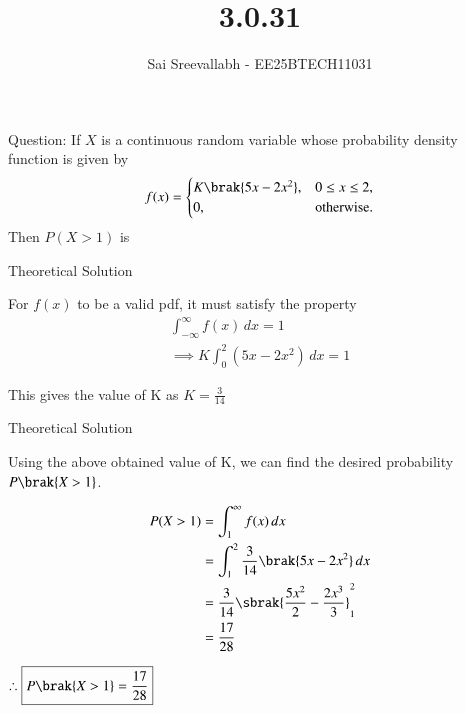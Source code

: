 \documentclass{beamer}
\title 
{3.0.31}
\date{}
\author 
{Sai Sreevallabh - EE25BTECH11031}
\begin{document}
\frame{\titlepage}

\begin{frame}{Question:}
If $X$ is a continuous random variable whose probability density function is given by
       $$
f(x) =
\begin{cases}
K\brak{5x - 2x^2}, & 0 \leq x \leq 2, \\
0, & \text{otherwise}.
\end{cases}
$$
 Then $P(X>1)$ is
    
\end{frame}

\begin{frame}{Theoretical Solution}

For $f(x)$ to be a valid pdf, it must satisfy the property
\begin{align*}
    \int_{-\infty}^{\infty} f(x) \, dx = 1\\
    \implies K \int_{0}^{2} (5x - 2x^2) \, dx = 1
\end{align*}

This gives the value of K as $\boxed{K = \frac{3}{14}}$
    
\end{frame}

\begin{frame}{Theoretical Solution}

Using the above obtained value of K, we can find the desired probability $P\brak{X>1}$.

\begin{align*}
P(X > 1) &= \int_{1}^{\infty} f(x) \, dx \\
&= \int_{1}^{2} \frac{3}{14} \brak{5x - 2x^2} \, dx \\
&= \frac{3}{14} \sbrak{\frac{5x^2}{2} - \frac{2x^3}{3}}_1^2 \\
& = \frac{17}{28}
\end{align*}

$\therefore \boxed{P\brak{X>1} = \frac{17}{28}}$ 
    
\end{frame}
\end{document}
